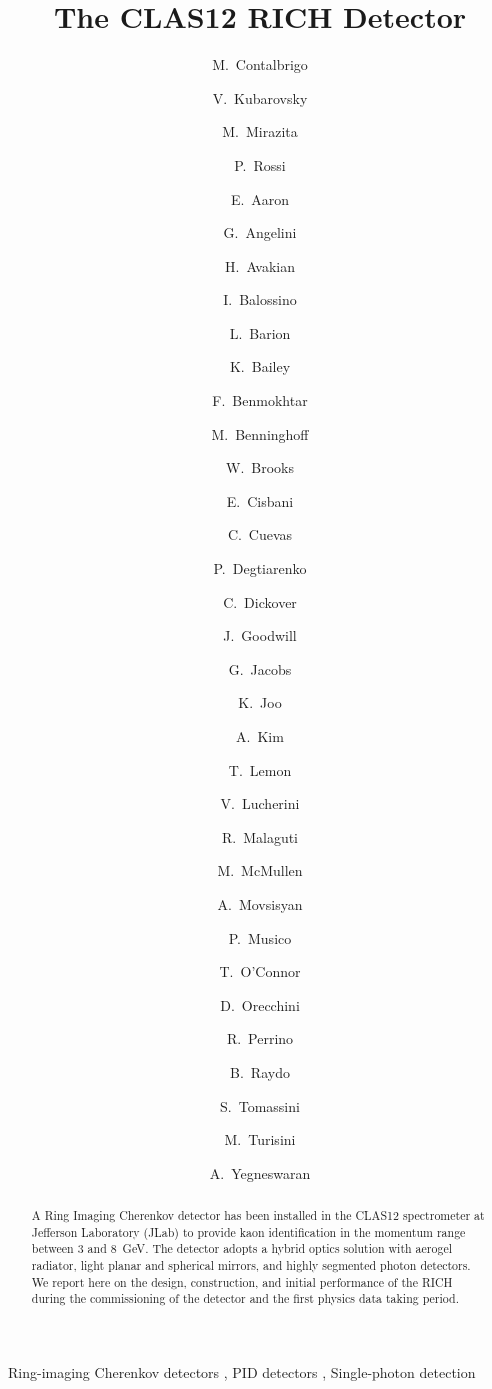 \documentclass[5p,times,twocolumn]{elsarticle}
\title{The CLAS12 RICH Detector}
\begin{document}
\begin{frontmatter}

\author[a]{M.~Contalbrigo}
\author[f]{V.~Kubarovsky}
\author[b]{M.~Mirazita}
\author[f,b]{P.~Rossi}
\author[h]{E.~Aaron}
\author[b,j]{G.~Angelini}
\author[f]{H.~Avakian}
\author[a]{I.~Balossino}
\author[a]{L.~Barion}
\author[g]{K.~Bailey}
\author[h]{F.~Benmokhtar}
\author[h]{M.~Benninghoff}
\author[k]{W.~Brooks}
\author[c]{E.~Cisbani}
\author[f]{C.~Cuevas}
\author[f]{P.~Degtiarenko}
\author[f]{C.~Dickover}
\author[h]{J.~Goodwill}
\author[f]{G.~Jacobs}
\author[i]{K.~Joo}
\author[i]{A.~Kim}
\author[f]{T.~Lemon}
\author[b]{V.~Lucherini}
\author[a]{R.~Malaguti}
\author[f]{M.~McMullen}
\author[a]{A.~Movsisyan}
\author[d]{P.~Musico}
\author[g]{T.~O'Connor}
\author[b]{D.~Orecchini}
\author[e]{R.~Perrino}
\author[f]{B.~Raydo}
\author[b]{S.~Tomassini}
\author[a,b]{M.~Turisini}
\author[f]{A.~Yegneswaran}


\address[a]{INFN Sezione di Ferrara and University of Ferrara, Italy}
\address[b]{INFN Laboratori Nazionali di Frascati, Italy}
\address[c]{INFN Sezione di Roma1 - Gruppo Collegato Sanit\`a and Italian National Institute of Health, RM, Italy}
\address[d]{INFN Sezione di Genova, GE, Italy}
\address[e]{INFN Sezione di Bari, Italy}
\address[f]{Thomas Jefferson National Accelerator Facility, VA, USA}
\address[g]{Argonne National Laboratory, IL, USA}
\address[h]{Duquesne University, PA, USA}
\address[i]{University of Connecticut, CT, USA}
\address[j]{George Washington University, DC, USA}
\address[k]{Universidad Tecnica Federico Santa Maria, Valparaiso, Chile}

\begin{abstract}
  A Ring Imaging Cherenkov detector has been installed in the CLAS12 spectrometer at Jefferson Laboratory (JLab)
  to provide kaon identification in the momentum range between 3 and 8~GeV. The detector adopts a hybrid optics
  solution with aerogel radiator, light planar and spherical mirrors, and highly segmented photon detectors. We report
  here on the design, construction, and initial performance of the RICH during the commissioning of the detector and
  the first physics data taking period. 
\end{abstract}

\begin{keyword}
Ring-imaging Cherenkov detectors
\sep
PID detectors
\sep
Single-photon detection
\end{keyword}


\end{frontmatter}
\end{document}
